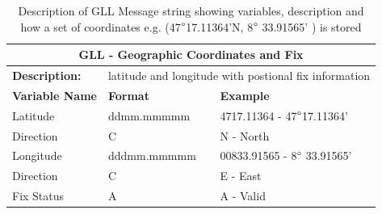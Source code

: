 \begin{table}[H]
	\centering
	\caption{Description of GLL Message string showing variables, description and how a set of coordinates e.g. (47$\degree$17.11364'N,  8$\degree$ 33.91565' ) is stored}
	\begin{tabular}{|l|l|l|}
		\hline
		\multicolumn{3}{|c|}{\textbf{GLL - Geographic Coordinates and Fix}}\\
		\hline
		\textbf{Description:} & \multicolumn{2}{l|}{ latitude and longitude with postional fix information}\\
		\hline
		\textbf{Variable Name} & \textbf{Format}& \textbf{Example} \\
		\hline
		Latitude & ddmm.mmmmm & 4717.11364 - 47$\degree$17.11364'\\
		\hline
		Direction  & C & N - North \\
		\hline
		Longitude &dddmm.mmmmm & 00833.91565 - 8$\degree$ 33.91565' \\
		\hline
		Direction & C & E - East \\
		\hline
		Fix Status & A & A - Valid\\
		\hline
	\end{tabular}
	
	\label{tab:NMEA_GLL}
\end{table}

